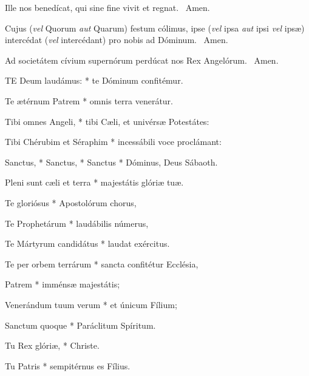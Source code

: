 
 Ille nos benedícat, qui sine fine vivit et regnat. \R\ Amen.

 Cujus (\textit{vel} Quorum \textit{aut} Quarum) festum cólimus, ipse (\textit{vel} ipsa \textit{aut} ipsi \textit{vel} ipsæ) intercédat (\textit{vel} intercédant) pro nobis ad Dóminum. \R\ Amen.

 Ad societátem cívium supernórum perdúcat nos Rex Angelórum. \R\ Amen.




\lettrine[lines=2]{T}{E} Deum laudámus: * te Dóminum confitémur.

Te ætérnum Patrem * omnis terra venerátur.

Tibi omnes Angeli, * tibi Cæli, et univérsæ Potestátes:

Tibi Chérubim et Séraphim * incessábili voce proclámant:

Sanctus, * Sanctus, * Sanctus * Dóminus, Deus Sábaoth.

Pleni sunt cæli et terra * majestátis glóriæ tuæ.

Te gloriósus * Apostolórum chorus,

Te Prophetárum * laudábilis númerus,

Te Mártyrum candidátus * laudat exércitus.

Te per orbem terrárum * sancta confitétur Ecclésia,

Patrem * imménsæ majestátis;

Venerándum tuum verum * et únicum Fílium;

Sanctum quoque * Paráclitum Spíritum.

Tu Rex glóriæ, * Christe.

Tu Patris * sempitérnus es Fílius.

